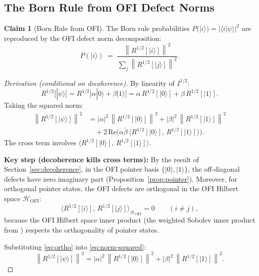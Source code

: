 \documentclass[12pt]{article}
\theoremstyle{definition}
\newtheorem{claim}[theorem]{Claim}
\newcommand{\norm}[1]{\left\|#1\right\|}
\newcommand{\inner}[2]{\langle #1,\, #2 \rangle}
\newcommand{\OFI}{\mathrm{OFI}}
\begin{document}
\subsection{The Born Rule from OFI Defect Norms}

\begin{claim}[Born Rule from OFI]
\label{claim:born}
The Born rule probabilities
$P(|i\rangle) = |\langle i|\psi\rangle|^2$
are reproduced by the OFI defect norm decomposition:
\begin{equation}
  P(|i\rangle)
  \;=\;
  \frac{\norm{R^{1/2}[|i\rangle]}^2}
       {\sum_j \norm{R^{1/2}[|j\rangle]}^2}.
  \label{eq:born-ofi}
\end{equation}
\end{claim}

\begin{proof}[Derivation (conditional on decoherence)]
By linearity of $I^{1/2}$:
\begin{equation}
  R^{1/2}[|\psi\rangle]
  = R^{1/2}\bigl[\alpha|0\rangle + \beta|1\rangle\bigr]
  = \alpha\, R^{1/2}[|0\rangle] + \beta\, R^{1/2}[|1\rangle].
  \label{eq:linear-defect}
\end{equation}
Taking the squared norm:
\begin{align}
  \norm{R^{1/2}[|\psi\rangle]}^2
  &= |\alpha|^2\,\norm{R^{1/2}[|0\rangle]}^2
   + |\beta|^2\,\norm{R^{1/2}[|1\rangle]}^2 \nonumber\\
  &\quad + 2\,\mathrm{Re}\bigl(
      \alpha\bar\beta\,
      \inner{R^{1/2}[|0\rangle]}{R^{1/2}[|1\rangle]}
    \bigr).
  \label{eq:norm-squared}
\end{align}
The cross term involves
$\inner{R^{1/2}[|0\rangle]}{R^{1/2}[|1\rangle]}$.

\textbf{Key step (decoherence kills cross terms):}
By the result of Section~\ref{sec:decoherence}, in the OFI pointer
basis $\{|0\rangle, |1\rangle\}$, the off-diagonal defects have zero
imaginary part (Proposition~\ref{prop:pointer}).  Moreover, for orthogonal
pointer states, the OFI defects are orthogonal in the OFI Hilbert space
$\mathcal{H}_{\OFI}$:
\begin{equation}
  \inner{R^{1/2}[|i\rangle]}{R^{1/2}[|j\rangle]}_{\mathcal{H}_{\OFI}}
  = 0
  \qquad (i \neq j),
  \label{eq:ortho}
\end{equation}
because the OFI Hilbert space inner product (the weighted Sobolev inner
product from \cite{OFI_Hilbert}) respects the orthogonality of pointer
states.

Substituting \eqref{eq:ortho} into \eqref{eq:norm-squared}:
\begin{equation}
  \norm{R^{1/2}[|\psi\rangle]}^2
  = |\alpha|^2\,\norm{R^{1/2}[|0\rangle]}^2
  + |\beta|^2\,\norm{R^{1/2}[|1\rangle]}^2.
  \label{eq:norm-diag}
\end{equation}


\end{proof}
\end{document}
